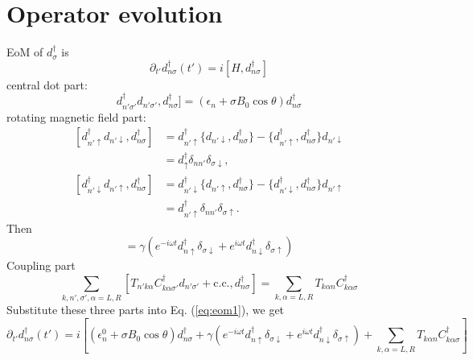 \documentclass[11pt,a4paper]{article}
\begin{document}
\section{Operator evolution}
EoM of $d_{\sigma}^{\dag}$ is
\begin{equation}
\partial_{t'} d_{n\sigma}^{\dag}(t') = i[H, d_{n\sigma}^{\dag}]
\label{eq:eom1}
\end{equation}
central dot part:
\begin{equation}
[\sum_{n'\sigma'}\left[\epsilon_{n'}+\sigma B_{0} \cos \theta\right] d_{n'\sigma'}^{\dag} d_{n'\sigma'}, d_{n\sigma}^{\dag}] =(\epsilon_{n}+\sigma B_{0} \cos \theta) d_{n\sigma}^{\dag}
\label{eq:part1}
\end{equation}
rotating magnetic field part:
\begin{equation}
\begin{split}
[d_{n'\uparrow}^{\dag} d_{n'\downarrow}, d_{n\sigma}^{\dag}] &= d_{n'\uparrow}^{\dag}\{d_{n'\downarrow}, d_{n\sigma}^{\dag}\} - \{d_{n'\uparrow}^{\dag}, d_{n\sigma}^{\dag}\}d_{n'\downarrow} \\
&=d_{\uparrow}^{\dag}\delta_{nn'}\delta_{\sigma\downarrow},
\end{split}
\end{equation}
\begin{equation}
\begin{split}
[d_{n'\downarrow}^{\dag} d_{n'\uparrow}, d_{n\sigma}^{\dag}] &= d_{n'\downarrow}^{\dag}\{d_{n'\uparrow}, d_{n\sigma}^{\dag}\} - \{d_{n'\downarrow}^{\dag}, d_{n\sigma}^{\dag}\}d_{n'\uparrow} \\
&=d_{n'\uparrow}^{\dag}\delta_{nn'}\delta_{\sigma\uparrow}.
\end{split}
\end{equation}
Then
\begin{equation}
[H^{\prime}(t), d_{n\sigma}^{\dag}] = \gamma(e^{-i \omega t} d_{n\uparrow}^{\dag} \delta_{\sigma\downarrow} + e^{i \omega t} d_{n\downarrow}^{\dag} \delta_{\sigma\uparrow})
\end{equation}
Coupling part
\begin{equation}
\sum_{k, n',\sigma', \alpha=L, R}\left[T_{n'k \alpha} C_{k \alpha \sigma'}^{\dag} d_{n'\sigma'}+\mathrm{c.c.}, d_{n\sigma}^{\dag}\right] = \sum_{k, \alpha=L, R}T_{k \alpha n} C_{k \alpha \sigma}^{\dag}
\label{eq:part3}
\end{equation}
Substitute these three parts into Eq. (\ref{eq:eom1}), we get
\begin{equation}
\partial_{t'} d_{n\sigma}^{\dag}(t') = i[(\epsilon_{n}^{0}+\sigma B_{0} \cos \theta) d_{n\sigma}^{\dag} + \gamma(e^{-i \omega t} d_{n\uparrow}^{\dag} \delta_{\sigma\downarrow} + e^{i \omega t} d_{n\downarrow}^{\dag} \delta_{\sigma\uparrow}) + \sum_{k, \alpha=L, R}T_{k \alpha n} C_{k \alpha \sigma}^{\dag}]
\end{equation}
\end{document}
